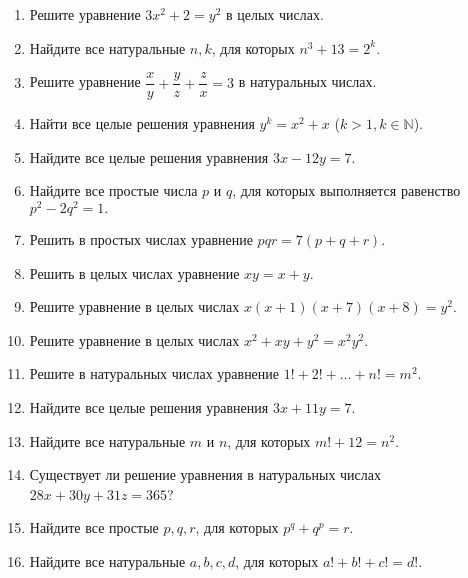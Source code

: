 \documentclass{article}
\begin{document}
    \begin{enumerate}[label*=\protect\fbox{\arabic{enumi}}]

        \item Решите уравнение $3x^2 + 2 = y^2$ в целых числах.

        \item Найдите все натуральные $n, k$, для которых $n^3 + 13 = 2^k$.

        \item Решите уравнение $\dfrac{x}{y} + \dfrac{y}{z} + \dfrac{z}{x} = 3$ в натуральных числах.

        \item Найти все целые решения уравнения  $y^k = x^2 + x $ ($k > 1, k \in \mathbb{N}$).

        \item Найдите все целые решения уравнения $3x - 12y = 7.$

        \item Найдите все простые числа $p$ и $q$, для которых выполняется равенство  $p^2 - 2q^2 = 1.$

        \item Решить в простых числах уравнение  $pqr = 7(p + q + r).$

        \item Решить в целых числах уравнение  $xy = x + y.$

        \item Решите уравнение в целых числах  $x(x+1)(x+7)(x+8) = y^2.$

        \item Решите уравнение в целых числах  $x^2 + xy + y^2 = x^{2}y^2.$

        \item Решите в натуральных числах уравнение   $1! + 2! + \dotsc + n! = m^2$.

        \item Найдите все целые решения уравнения $3x + 11y = 7.$

        \item Найдите все натуральные $m$ и $n$, для которых $m! + 12 = n^2$.

        \item Существует ли решение уравнения в натуральных числах $28x + 30y+ 31z = 365$?

        \item Найдите все простые $p, q, r$, для которых $p^q + q^p = r$.

        \item Найдите все натуральные $a, b, c, d$, для которых $a!+b!+c! = d!$.


\end{enumerate}
\end{document}
